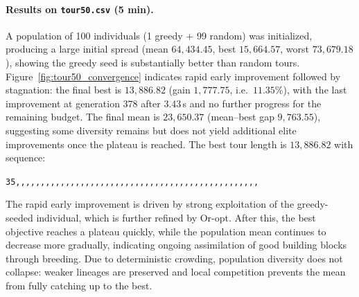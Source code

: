 \documentclass[a4paper,10pt]{article}
\begin{document}
\paragraph{Results on \texttt{tour50.csv} (5 min).}
A population of 100 individuals (1 greedy + 99 random) was initialized, producing a large initial spread (mean $64{,}434.45$, best $15{,}664.57$, worst $73{,}679.18$), showing the greedy seed is substantially better than random tours.
Figure~\ref{fig:tour50_convergence} indicates rapid early improvement followed by stagnation: the final best is $13{,}886.82$ (gain $1{,}777.75$, i.e.\ $11.35\%$), with the last improvement at generation 378 after 3.43\,s and no further progress for the remaining budget.
The final mean is $23{,}650.37$ (mean--best gap $9{,}763.55$), suggesting some diversity remains but does not yield additional elite improvements once the plateau is reached.
The best tour length is $13{,}886.82$ with sequence:



\texttt{35,,,,,,,,,,,,,,,,,,,,,,,,,,,,,,,,,,,,,,,,,,,,,,,,,}


The rapid early improvement is driven by strong exploitation of the greedy-seeded individual, which is further refined by Or-opt. After this, the best objective reaches a plateau quickly, while the population mean continues to decrease more gradually, indicating ongoing assimilation of good building blocks through breeding. Due to deterministic crowding, population diversity does not collapse: weaker lineages are preserved and local competition prevents the mean from fully catching up to the best.
\end{document}
